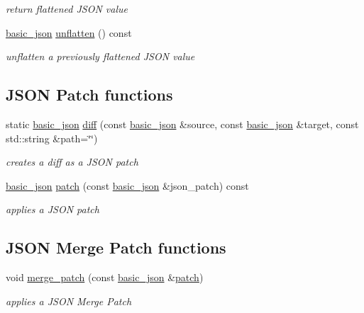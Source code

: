 \begin{DoxyCompactItemize}
\begin{DoxyCompactList}\small\item\em return flattened J\+S\+ON value \end{DoxyCompactList}\item 
\hyperlink{classnlohmann_1_1basic__json}{basic\+\_\+json} \hyperlink{classnlohmann_1_1basic__json_a74fa3ab2003f2f6f2b69deaafed9126d}{unflatten} () const
\begin{DoxyCompactList}\small\item\em unflatten a previously flattened J\+S\+ON value \end{DoxyCompactList}\end{DoxyCompactItemize}
\subsection*{J\+S\+ON Patch functions}
\begin{DoxyCompactItemize}
\item 
static \hyperlink{classnlohmann_1_1basic__json}{basic\+\_\+json} \hyperlink{classnlohmann_1_1basic__json_a543bd5f7490de54c875b2c0912dc9a49}{diff} (const \hyperlink{classnlohmann_1_1basic__json}{basic\+\_\+json} \&source, const \hyperlink{classnlohmann_1_1basic__json}{basic\+\_\+json} \&target, const std\+::string \&path=\char`\"{}\char`\"{})
\begin{DoxyCompactList}\small\item\em creates a diff as a J\+S\+ON patch \end{DoxyCompactList}\item 
\hyperlink{classnlohmann_1_1basic__json}{basic\+\_\+json} \hyperlink{classnlohmann_1_1basic__json_a81e0c41a4a9dff4df2f6973f7f8b2a83}{patch} (const \hyperlink{classnlohmann_1_1basic__json}{basic\+\_\+json} \&json\+\_\+patch) const
\begin{DoxyCompactList}\small\item\em applies a J\+S\+ON patch \end{DoxyCompactList}\end{DoxyCompactItemize}
\subsection*{J\+S\+ON Merge Patch functions}
\begin{DoxyCompactItemize}
\item 
void \hyperlink{classnlohmann_1_1basic__json_a0ec0cd19cce42ae6071f3cc6870ea295}{merge\+\_\+patch} (const \hyperlink{classnlohmann_1_1basic__json}{basic\+\_\+json} \&\hyperlink{classnlohmann_1_1basic__json_a81e0c41a4a9dff4df2f6973f7f8b2a83}{patch})
\begin{DoxyCompactList}\small\item\em applies a J\+S\+ON Merge Patch \end{DoxyCompactList}\end{DoxyCompactItemize}


